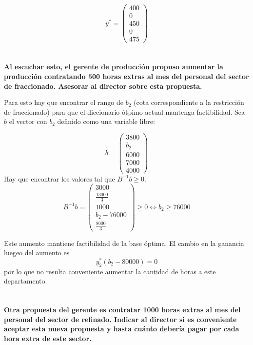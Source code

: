 \documentclass[10pt,a4paper]{article}
\begin{document}
$$
y^* = \begin{pmatrix}
	400 \\
	0 \\
	450 \\
	0 \\
	475
\end{pmatrix}
$$

\section{} %
\textbf{Al escuchar esto, el gerente de producción propuso aumentar la producción contratando 500 horas extras al mes del personal del sector de fraccionado. Asesorar al director sobre esta propuesta.}

\vspace{5mm}

Para esto hay que encontrar el rango de $b_2$ (cota correspondiente a la restricción de fraccionado) para que el diccionario ótpimo actual mantenga factibilidad. Sea $b$ el vector con $b_2$ definido como una variable libre:

$$
b = \begin{pmatrix}
	3800 \\
	b_2 \\
	6000 \\
	7000 \\
	4000
\end{pmatrix}
$$
Hay que encontrar los valores tal que $B^{-1}b \geq 0$.
$$
B^{-1}b = \begin{pmatrix}
	3000 \\
	\frac{13000}{3} \\
	1000 \\
	b_2 - 76000 \\
	\frac{8000}{3}
\end{pmatrix}  \geq 0 \iff b_2 \geq 76000
$$

Este aumento mantiene factibilidad de la base óptima. El cambio en la ganancia luegeo del aumento es
$$y^*_2(b_2 - 80000) = 0$$ por lo que no resulta conveniente aumentar la cantidad de horas a este departamento.

\section{} %
\textbf{Otra propuesta del gerente es contratar 1000 horas extras al mes del personal del sector de refinado. Indicar al director si es conveniente aceptar esta nueva propuesta y hasta cuánto debería pagar por cada hora extra de este sector.}
\end{document}
